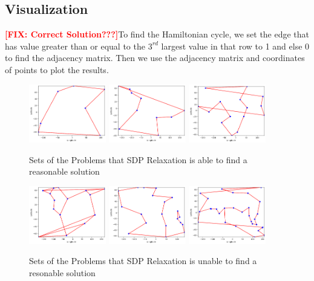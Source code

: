 \documentclass{article}
\begin{document}
\subsection{Visualization}
\textbf{\textcolor{red}{[FIX: Correct Solution???]}}To find the Hamiltonian cycle, we set the edge that has value greater than or equal to the $3^{rd}$ largest value in that row to 1 and else 0 to find the adjacency matrix. Then we use the adjacency matrix and coordinates of points to plot the results.
\begin{figure}[!ht]
    \centering
    \includegraphics[width=0.3\textwidth]{assets/tsp7.png}
    \includegraphics[width=0.3\textwidth]{assets/tsp-10.png}
    \includegraphics[width=0.3\textwidth]{assets/tsp-15-works.png}
    \caption{Sets of the Problems that SDP Relaxation is able to find a reasonable solution}
    \label{fig:TSP Graph}
\end{figure}
\begin{figure}[!ht]
    \centering
    \includegraphics[width=0.3\textwidth]{assets/tsp-15.png}
    \includegraphics[width=0.3\textwidth]{assets/tsp-20.png}
    \includegraphics[width=0.3\textwidth]{assets/tsp-30.png}
    \caption{Sets of the Problems that SDP Relaxation is unable to find a resonable solution}
    \label{fig:TSP Graph 2}
\end{figure}
\end{document}
